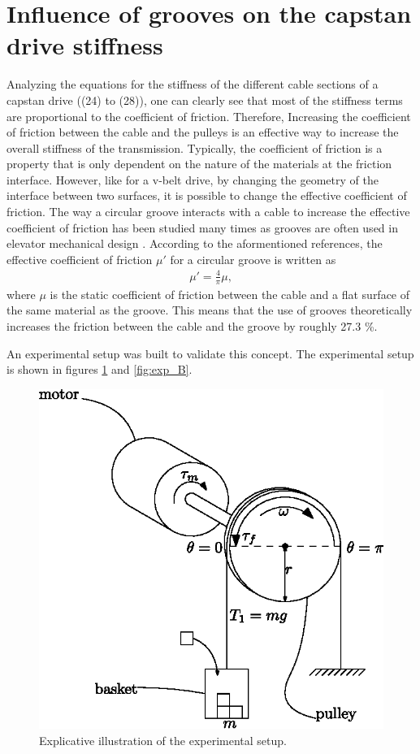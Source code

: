 \documentclass[10pt,cleanfoot]{asme2ej}
\begin{document}
\section{Influence of grooves on the capstan drive stiffness}
 Analyzing the equations for the stiffness of the different cable sections of a capstan drive ((24) to (28)), one can clearly see that most of the stiffness terms are proportional to the coefficient of friction. Therefore, Increasing the coefficient of friction between the cable and the pulleys is an effective way to increase the overall stiffness of the transmission. Typically, the coefficient of friction is a property that is only dependent on the nature of the materials at the friction interface. However, like for a v-belt drive, by changing the geometry of the interface between two surfaces, it is possible to change the effective coefficient of friction. The way a circular groove interacts with a cable to increase the effective coefficient of friction has been studied many times as grooves are often used in elevator mechanical design \cite{elevator_german}\cite{elevator}\cite{gibsonfred}\cite{koshaktraction}. According to the aformentioned references, the effective coefficient of friction $\mu'$ for a circular groove is written as 
 \begin{align}
\mu' = \frac{4}{\pi}\mu, 
 \end{align}
where $\mu$ is the static coefficient of friction between the cable and a flat surface of the same material as the groove. This means that the use of grooves theoretically increases the friction between the cable and the groove by roughly 27.3 \%.
\par
An experimental setup was built to validate this concept. The experimental setup is shown in figures \ref{fig:exp_A} and \ref{fig:exp_B}. 
\begin{figure}
\centering
\includegraphics[width=0.5\columnwidth]{experimental_setup.eps}
\caption{Explicative illustration of the experimental setup.}
\label{fig:exp_A}
\end{figure}
\end{document}

